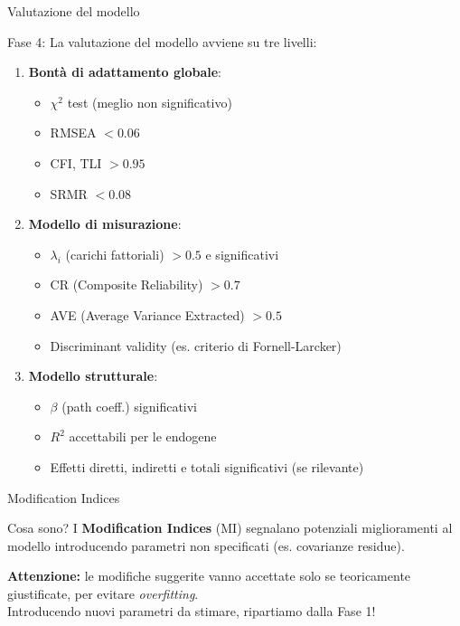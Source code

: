 \documentclass{beamer}
\begin{document}
\begin{frame}{Valutazione del modello}
    \begin{block}{Fase 4:}
        La valutazione del modello avviene su tre livelli:
        \begin{enumerate}
            \item \textbf{Bontà di adattamento globale}:
            \begin{itemize}
                \item $\chi^2$ test (meglio non significativo)
                \item RMSEA $< 0.06$
                \item CFI, TLI $> 0.95$
                \item SRMR $< 0.08$
            \end{itemize}
            \item \textbf{Modello di misurazione}:
            \begin{itemize}
                \item $\lambda_i$ (carichi fattoriali) $> 0.5$ e significativi
                \item CR (Composite Reliability) $> 0.7$
                \item AVE (Average Variance Extracted) $> 0.5$
                \item Discriminant validity (es. criterio di Fornell-Larcker)
            \end{itemize}
            \item \textbf{Modello strutturale}:
            \begin{itemize}
                \item $\beta$ (path coeff.) significativi
                \item $R^2$ accettabili per le endogene
                \item Effetti diretti, indiretti e totali significativi (se rilevante)
            \end{itemize}
        \end{enumerate}
    \end{block}
\end{frame}

\begin{frame}{Modification Indices}
    \begin{block}{Cosa sono?}
        I \textbf{Modification Indices} (MI) segnalano potenziali miglioramenti al modello introducendo parametri non specificati (es. covarianze residue).
    \end{block}
    \vspace{1em}
    \textbf{Attenzione:} le modifiche suggerite vanno accettate solo se teoricamente giustificate, per evitare \textit{overfitting}.\\
    \vspace{1em}
    Introducendo nuovi parametri da stimare, ripartiamo dalla Fase 1!
\end{frame}
\end{document}
